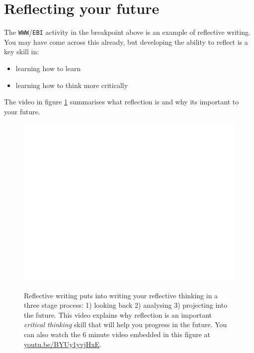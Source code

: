 \documentclass[
]{book}
\providecommand{\tightlist}{%
  \setlength{\itemsep}{0pt}\setlength{\parskip}{0pt}}
\begin{document}
\hypertarget{reflecting}{%
\section{Reflecting your future}\label{reflecting}}

The \texttt{WWW}/\texttt{EBI} activity in the breakpoint above is an example of reflective writing. You may have come across this already, but developing the ability to reflect is a key skill in:

\begin{itemize}
\tightlist
\item
  learning how to learn
\item
  learning how to think more critically
\end{itemize}

The video in figure \ref{fig:reflecting-fig} summarises what reflection is and why its important to your future.

\begin{figure}

{\centering \href{https://www.youtube.com/embed/QoI67VeE3ds}{\includegraphics[width=0.99\linewidth]{cdyf_files/figure-latex/reflecting-fig-1} }

}

\caption{Reflective writing puts into writing your reflective thinking in a three stage process: 1) looking back 2) analysing 3) projecting into the future. This video explains why reflection is an important \emph{critical thinking} skill that will help you progress in the future. You can also watch the 6 minute video embedded in this figure at \href{https://youtu.be/BYUy1yvjHxE}{youtu.be/BYUy1yvjHxE}. \citep{youtube-reflective}}\label{fig:reflecting-fig}
\end{figure}
\end{document}
